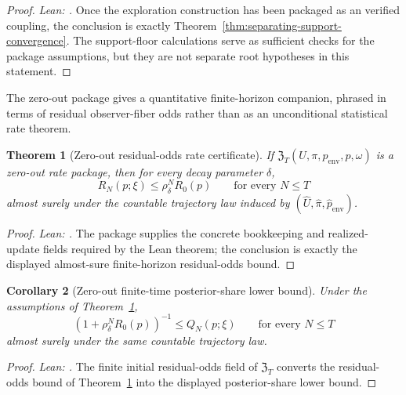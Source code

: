 \documentclass[11pt]{article}
\newtheorem{theorem}{Theorem}[section]
\newtheorem{corollary}[theorem]{Corollary}
\theoremstyle{definition}
\theoremstyle{remark}
\theoremstyle{plain}
\theoremstyle{definition}
\begin{document}
\begin{proof}
\noindent\emph{Lean: .}
Once the exploration construction has been packaged as an verified coupling, the conclusion is exactly Theorem~\ref{thm:separating-support-convergence}. The support-floor calculations serve as sufficient checks for the package assumptions, but they are not separate root hypotheses in this statement.
\end{proof}

The zero-out package gives a quantitative finite-horizon companion, phrased in terms of residual observer-fiber odds rather than as an unconditional statistical rate theorem.

\begin{theorem}[Zero-out residual-odds rate certificate]
\label{thm:separating-support-rate}
If $\mathfrak Z_T(U,\pi,p_{\mathrm{env}},p,\omega)$ is a zero-out rate package, then for every decay parameter $\delta$,
\[
R_N(p;\xi)\le \rho_\delta^N R_0(p)
\qquad
\text{for every }N\le T
\]
almost surely under the countable trajectory law induced by $(\widehat U,\widehat\pi,\widehat p_{\mathrm{env}})$.
\end{theorem}

\begin{proof}
\noindent\emph{Lean: .}
The package supplies the concrete bookkeeping and realized-update fields required by the Lean theorem; the conclusion is exactly the displayed almost-sure finite-horizon residual-odds bound.
\end{proof}

\begin{corollary}[Zero-out finite-time posterior-share lower bound]
\label{cor:separating-support-finite-time}
Under the assumptions of Theorem~\ref{thm:separating-support-rate},
\[
\left(1+\rho_\delta^N R_0(p)\right)^{-1}
\le
Q_N(p;\xi)
\qquad
\text{for every }N\le T
\]
almost surely under the same countable trajectory law.
\end{corollary}

\begin{proof}
\noindent\emph{Lean: .}
The finite initial residual-odds field of $\mathfrak Z_T$ converts the residual-odds bound of Theorem~\ref{thm:separating-support-rate} into the displayed posterior-share lower bound.
\end{proof}
\end{document}
